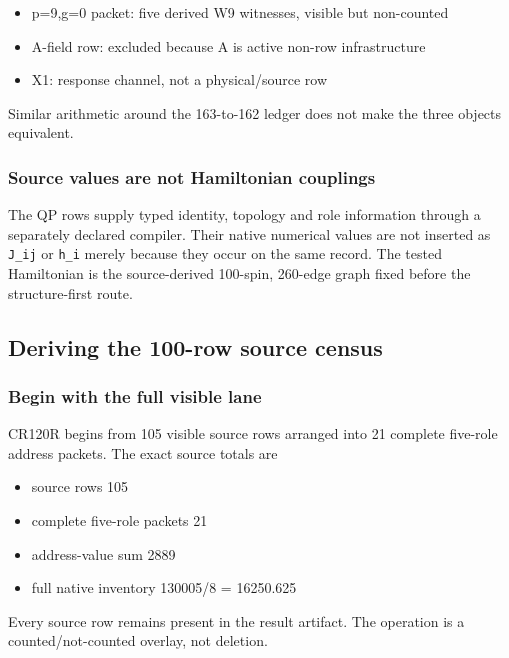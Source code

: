 \begin{itemize}
\tightlist
\item
  p=9,g=0 packet: five derived W9 witnesses, visible but non-counted
\item
  A-field row: excluded because A is active non-row infrastructure
\item
  X1: response channel, not a physical/source row
\end{itemize}

Similar arithmetic around the 163-to-162 ledger does not make the three
objects equivalent.

\subsubsection{Source values are not Hamiltonian
couplings}\label{viii-ch01-source-values-are-not-hamiltonian-couplings}

The QP rows supply typed identity, topology and role information through
a separately declared compiler. Their native numerical values are not
inserted as \texttt{J\_ij} or \texttt{h\_i} merely because they occur on
the same record. The tested Hamiltonian is the source-derived 100-spin,
260-edge graph fixed before the structure-first route.

\subsection{Deriving the 100-row source
census}\label{viii-ch01-deriving-the-100-row-source-census}

\subsubsection{Begin with the full visible
lane}\label{viii-ch01-begin-with-the-full-visible-lane}

CR120R begins from 105 visible source rows arranged into 21 complete
five-role address packets. The exact source totals are

\begin{itemize}
\tightlist
\item
  source rows 105
\item
  complete five-role packets 21
\item
  address-value sum 2889
\item
  full native inventory 130005/8 = 16250.625
\end{itemize}

Every source row remains present in the result artifact. The operation
is a counted/not-counted overlay, not deletion.

